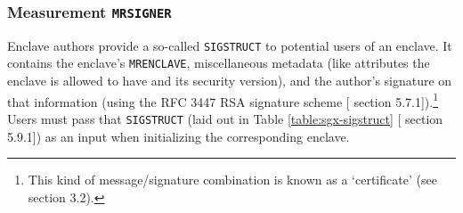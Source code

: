 \subsubsection{Measurement {\tt MRSIGNER}}

Enclave authors provide a so-called {\tt SIGSTRUCT} to potential users of an enclave. It contains the enclave's {\tt MRENCLAVE}, miscellaneous metadata (like attributes the enclave is allowed to have and its security version), and the author's signature on that information (using the RFC 3447 \cite{RSA-sig-RFC-3447} RSA signature scheme [\cite{intel-sgx-explained-advanced} section 5.7.1]).\footnote{This kind of message/signature combination is known as a `certificate' (see \cite{intel-sgx-explained-advanced} section 3.2).} Users must pass that {\tt SIGSTRUCT} (laid out in Table \ref{table:sgx-sigstruct} [\cite{intel-sgx-explained-advanced} section 5.9.1]) as an input when initializing the corresponding enclave.

